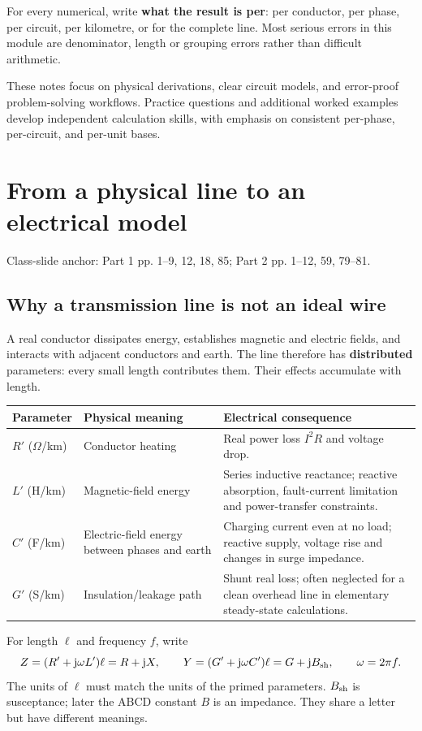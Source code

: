 \documentclass[11pt,a4paper]{article}
\newenvironment{Caution}[1]{\begin{tcolorbox}[colback=warm,colframe=rust,coltitle=white,title={#1}]}{\end{tcolorbox}}
\newcommand{\slides}[1]{{\small\color{muted}\textsf{Class-slide anchor: #1.}}\par}
\newcommand{\chapterstart}[2]{\clearpage\section{#1}\label{#2}}
\newcommand{\jj}{\mathrm j}
\begin{document}
For every numerical, write \textbf{what the result is per}: per conductor, per phase, per circuit, per kilometre, or for the complete line. Most serious errors in this module are denominator, length or grouping errors rather than difficult arithmetic.

\begin{Caution}{Study approach and problem-solving}
These notes focus on physical derivations, clear circuit models, and error-proof problem-solving workflows. Practice questions and additional worked examples develop independent calculation skills, with emphasis on consistent per-phase, per-circuit, and per-unit bases.
\end{Caution}

\chapterstart{From a physical line to an electrical model}{foundation}
\slides{Part 1 pp. 1--9, 12, 18, 85; Part 2 pp. 1--12, 59, 79--81}
\subsection{Why a transmission line is not an ideal wire}
A real conductor dissipates energy, establishes magnetic and electric fields, and interacts with adjacent conductors and earth. The line therefore has \textbf{distributed} parameters: every small length contributes them. Their effects accumulate with length.
\begin{center}\small
\begin{tabularx}{\textwidth}{L{2.4cm}YY}
\toprule\textbf{Parameter} & \textbf{Physical meaning} & \textbf{Electrical consequence}\\\midrule
$R'$ ($\Omega$/km) & Conductor heating & Real power loss $I^2R$ and voltage drop.\\
$L'$ (H/km) & Magnetic-field energy & Series inductive reactance; reactive absorption, fault-current limitation and power-transfer constraints.\\
$C'$ (F/km) & Electric-field energy between phases and earth & Charging current even at no load; reactive supply, voltage rise and changes in surge impedance.\\
$G'$ (S/km) & Insulation/leakage path & Shunt real loss; often neglected for a clean overhead line in elementary steady-state calculations.\\\bottomrule
\end{tabularx}\end{center}
For length $\ell$ and frequency $f$, write
\[
 Z=(R'+\jj\omega L')\ell=R+\jj X,\qquad
 Y=(G'+\jj\omega C')\ell=G+\jj B_{\rm sh},\qquad \omega=2\pi f.
\]
The units of $\ell$ must match the units of the primed parameters. $B_{\rm sh}$ is susceptance; later the ABCD constant $B$ is an impedance. They share a letter but have different meanings.
\end{document}
